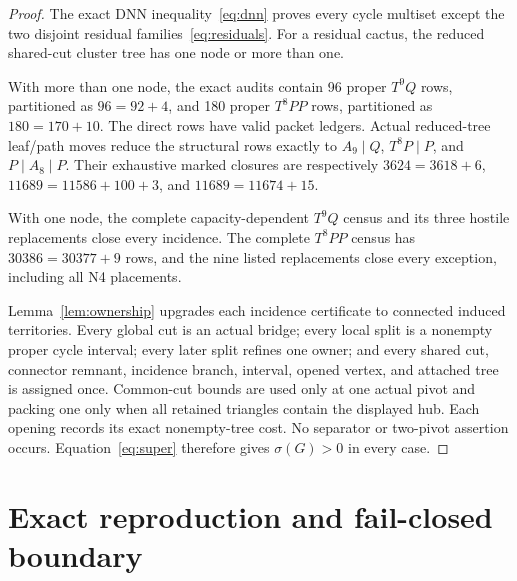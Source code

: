 \documentclass[11pt]{article}
\newcommand{\sig}{\sigma}
\begin{document}
\begin{proof}
The exact DNN inequality~\eqref{eq:dnn} proves every cycle multiset except the
two disjoint residual families~\eqref{eq:residuals}.  For a residual cactus,
the reduced shared-cut cluster tree has one node or more than one.

With more than one node, the exact audits contain 96 proper $T^9Q$ rows,
partitioned as $96=92+4$, and 180 proper $T^8PP$ rows, partitioned as
$180=170+10$.  The direct rows have valid packet ledgers.  Actual reduced-tree
leaf/path moves reduce the structural rows exactly to
$A_9\mid Q$, $T^8P\mid P$, and $P\mid A_8\mid P$.  Their exhaustive marked
closures are respectively $3624=3618+6$, $11689=11586+100+3$, and
$11689=11674+15$.

With one node, the complete capacity-dependent $T^9Q$ census and its three
hostile replacements close every incidence.  The complete $T^8PP$ census has
$30386=30377+9$ rows, and the nine listed replacements close every exception,
including all N4 placements.

Lemma~\ref{lem:ownership} upgrades each incidence certificate to connected
induced territories.  Every global cut is an actual bridge; every local split
is a nonempty proper cycle interval; every later split refines one owner; and
every shared cut, connector remnant, incidence branch, interval, opened vertex,
and attached tree is assigned once.  Common-cut bounds are used only at one
actual pivot and packing one only when all retained triangles contain the
displayed hub.  Each opening records its exact nonempty-tree cost.  No
separator or two-pivot assertion occurs.  Equation~\eqref{eq:super} therefore
gives $\sig(G)>0$ in every case.
\end{proof}

\appendix
\section{Exact reproduction and fail-closed boundary}\label{app:reproduction}
\end{document}
